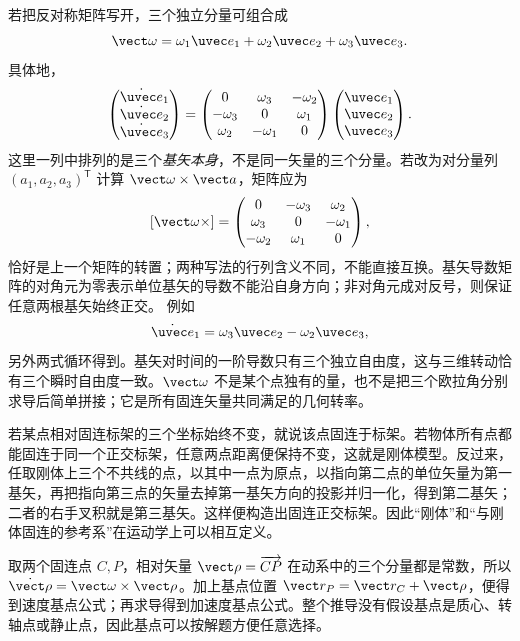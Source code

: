 若把反对称矩阵写开，三个独立分量可组合成
\[
  \vect\omega=\omega_1\uvec e_1+\omega_2\uvec e_2+\omega_3\uvec e_3.
\]
具体地，
\[
  \begin{pmatrix}
  \dot{\uvec e}_1\\ \dot{\uvec e}_2\\ \dot{\uvec e}_3
  \end{pmatrix}
  =
  \begin{pmatrix}
  0&\omega_3&-\omega_2\\
  -\omega_3&0&\omega_1\\
  \omega_2&-\omega_1&0
  \end{pmatrix}
  \begin{pmatrix}
  \uvec e_1\\ \uvec e_2\\ \uvec e_3
  \end{pmatrix}.
\]
这里一列中排列的是三个\emph{基矢本身}，不是同一矢量的三个分量。若改为对分量列 $(a_1,a_2,a_3)^{\mathsf T}$ 计算 $\vect\omega\times\vect a$，矩阵应为
\[
  [\vect\omega\times]=
  \begin{pmatrix}
  0&-\omega_3&\omega_2\\
  \omega_3&0&-\omega_1\\
  -\omega_2&\omega_1&0
  \end{pmatrix},
\]
恰好是上一个矩阵的转置；两种写法的行列含义不同，不能直接互换。基矢导数矩阵的对角元为零表示单位基矢的导数不能沿自身方向；非对角元成对反号，则保证任意两根基矢始终正交。
例如
\[
  \dot{\uvec e}_1=\omega_3\uvec e_2-\omega_2\uvec e_3,
\]
另外两式循环得到。基矢对时间的一阶导数只有三个独立自由度，这与三维转动恰有三个瞬时自由度一致。$\vect\omega$ 不是某个点独有的量，也不是把三个欧拉角分别求导后简单拼接；它是所有固连矢量共同满足的几何转率。

\figRigidFrame

若某点相对固连标架的三个坐标始终不变，就说该点固连于标架。若物体所有点都能固连于同一个正交标架，任意两点距离便保持不变，这就是刚体模型。反过来，任取刚体上三个不共线的点，以其中一点为原点，以指向第二点的单位矢量为第一基矢，再把指向第三点的矢量去掉第一基矢方向的投影并归一化，得到第二基矢；二者的右手叉积就是第三基矢。这样便构造出固连正交标架。因此“刚体”和“与刚体固连的参考系”在运动学上可以相互定义。

取两个固连点 $C,P$，相对矢量 $\vect\rho=\overrightarrow{CP}$ 在动系中的三个分量都是常数，所以
$\dot{\vect\rho}=\vect\omega\times\vect\rho$。加上基点位置
$\vect r_P=\vect r_C+\vect\rho$，便得到速度基点公式；再求导得到加速度基点公式。整个推导没有假设基点是质心、转轴点或静止点，因此基点可以按解题方便任意选择。

